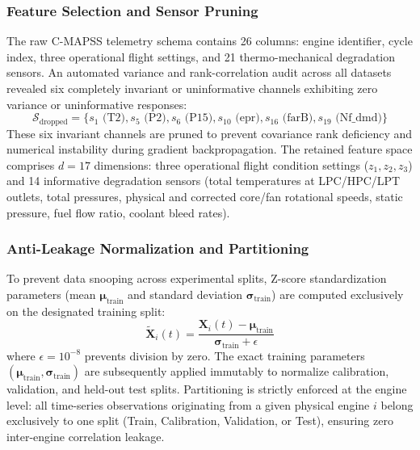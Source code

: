 \documentclass[12pt,a4paper]{article}
\begin{document}
\subsubsection*{Feature Selection and Sensor Pruning}
The raw C-MAPSS telemetry schema contains 26 columns: engine identifier, cycle index, three operational flight settings, and 21 thermo-mechanical degradation sensors. An automated variance and rank-correlation audit across all datasets revealed six completely invariant or uninformative channels exhibiting zero variance or uninformative responses:
\begin{equation}
\mathcal{S}_{\text{dropped}} = \{ s_1 \text{ (T2)}, s_5 \text{ (P2)}, s_6 \text{ (P15)}, s_{10} \text{ (epr)}, s_{16} \text{ (farB)}, s_{19} \text{ (Nf\_dmd)} \}
\end{equation}
These six invariant channels are pruned to prevent covariance rank deficiency and numerical instability during gradient backpropagation. The retained feature space comprises $d = 17$ dimensions: three operational flight condition settings ($z_1, z_2, z_3$) and 14 informative degradation sensors (total temperatures at LPC/HPC/LPT outlets, total pressures, physical and corrected core/fan rotational speeds, static pressure, fuel flow ratio, coolant bleed rates).

\subsubsection*{Anti-Leakage Normalization and Partitioning}
To prevent data snooping across experimental splits, Z-score standardization parameters (mean $\boldsymbol{\mu}_{\text{train}}$ and standard deviation $\boldsymbol{\sigma}_{\text{train}}$) are computed exclusively on the designated training split:
\begin{equation}
\tilde{\mathbf{X}}_i(t) = \frac{\mathbf{X}_i(t) - \boldsymbol{\mu}_{\text{train}}}{\boldsymbol{\sigma}_{\text{train}} + \epsilon}
\end{equation}
where $\epsilon = 10^{-8}$ prevents division by zero. The exact training parameters $(\boldsymbol{\mu}_{\text{train}}, \boldsymbol{\sigma}_{\text{train}})$ are subsequently applied immutably to normalize calibration, validation, and held-out test splits. Partitioning is strictly enforced at the engine level: all time-series observations originating from a given physical engine $i$ belong exclusively to one split (Train, Calibration, Validation, or Test), ensuring zero inter-engine correlation leakage.
\end{document}
